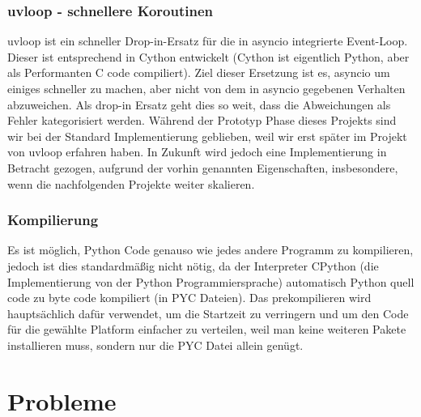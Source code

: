 \subsubsection{uvloop - schnellere Koroutinen}
uvloop ist ein schneller Drop-in-Ersatz für die in asyncio integrierte Event-Loop. 
Dieser ist entsprechend in Cython entwickelt 
(Cython ist eigentlich Python, aber als Performanten C code compiliert).
Ziel dieser Ersetzung ist es, asyncio um einiges schneller zu machen, 
aber nicht von dem in asyncio gegebenen Verhalten abzuweichen. 
Als drop-in Ersatz geht dies so weit, 
dass die Abweichungen als Fehler kategorisiert werden.
% 
Während der Prototyp Phase dieses Projekts 
sind wir bei der Standard Implementierung geblieben, 
weil wir erst später im Projekt von uvloop erfahren haben.
In Zukunft wird jedoch eine Implementierung in Betracht gezogen,
aufgrund der vorhin genannten Eigenschaften,
insbesondere, wenn die nachfolgenden Projekte weiter skalieren.

\subsubsection{Kompilierung}
Es ist möglich, Python Code genauso wie jedes andere Programm zu kompilieren,
jedoch ist dies standardmäßig nicht nötig, 
da der Interpreter CPython (die Implementierung von der Python Programmiersprache) 
automatisch Python quell code zu byte code kompiliert (in PYC Dateien).
Das prekompilieren wird hauptsächlich dafür verwendet, 
um die Startzeit zu verringern 
und um den Code für die gewählte Platform einfacher zu verteilen,
weil man keine weiteren Pakete installieren muss, 
sondern nur die PYC Datei allein genügt.


\section{Probleme}
